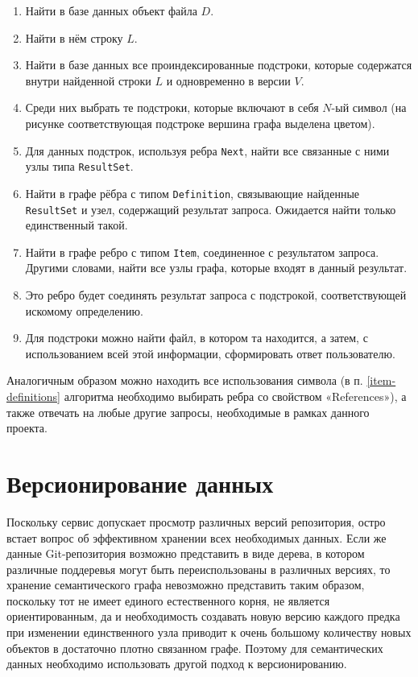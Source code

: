 \begin{enumerate}
    \item Найти в базе данных объект файла $D$.
    \item Найти в нём строку $L$.
    \item Найти в базе данных все проиндексированные подстроки, которые содержатся внутри найденной строки $L$ и одновременно в версии $V$.
    \item Среди них выбрать те подстроки, которые включают в себя $N$-ый символ (на рисунке соответствующая подстроке вершина графа выделена цветом).
    \item Для данных подстрок, используя ребра \texttt{Next}, найти все связанные с ними узлы типа \texttt{ResultSet}.
    \item Найти в графе рёбра с типом \texttt{Definition}, связывающие найденные \texttt{ResultSet} и узел, содержащий результат запроса. Ожидается найти только единственный такой.
    \item \label{item-definitions} Найти в графе ребро с типом \texttt{Item}, соединенное с результатом запроса. Другими словами, найти все узлы графа, которые входят в данный результат.
    \item Это ребро будет соединять результат запроса с подстрокой, соответствующей искомому определению.
    \item Для подстроки можно найти файл, в котором та находится, а затем, с использованием всей этой информации, сформировать ответ пользователю.
\end{enumerate}

Аналогичным образом можно находить все использования символа (в п. \ref{item-definitions} алгоритма необходимо выбирать ребра со свойством «References»), а также отвечать на любые другие запросы, необходимые в рамках данного проекта.

\section{Версионирование данных}

Поскольку сервис допускает просмотр различных версий репозитория, остро встает вопрос об эффективном хранении всех необходимых данных. Если же данные Git-репозитория возможно представить в виде дерева, в котором различные поддеревья могут быть переиспользованы в различных версиях, то хранение семантического графа невозможно представить таким образом, поскольку тот не имеет единого естественного корня, не является ориентированным, да и необходимость создавать новую версию каждого предка при изменении единственного узла приводит к очень большому количеству новых объектов в достаточно плотно связанном графе. Поэтому для семантических данных необходимо использовать другой подход к версионированию.

